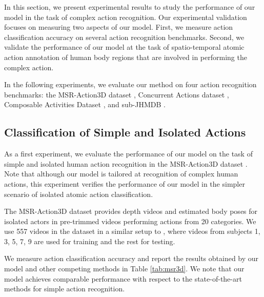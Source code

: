 In this section, we present experimental results to study the performance
of our model in the task of complex action recognition. Our experimental
validation focuses on measuring two aspects of our model.
First, we measure action classification accuracy on
several action recognition benchmarks.
Second, we validate the performance of our model at the
task of spatio-temporal atomic action
annotation of human body regions that are involved in performing the complex
action.


In the following experiments, we evaluate our method on four action recognition
benchmarks:
the MSR-Action3D dataset \cite{WanLi2010},
Concurrent Actions dataset \cite{Wei2013},
Composable Activities Dataset \cite{Lillo2014}, and sub-JHMDB
\cite{Jhuang2013}.


\subsection{Classification of Simple and Isolated Actions}

As a first experiment,
we evaluate the performance of our model on the task of simple and
isolated human action recognition in the  MSR-Action3D dataset
\cite{WanLi2010}.
Note that although our model is tailored at recognition of complex human
actions, this experiment verifies the performance of our model in the
simpler scenario of isolated atomic action classification.

The MSR-Action3D dataset provides depth videos and estimated body poses
for isolated actors in pre-trimmed videos performing actions from 20
categories. We use 557 videos in the dataset in a similar setup to
\cite{Wang2012}, where videos from subjects 1, 3, 5, 7, 9 are used for
training and the rest for testing.

We measure action classification accuracy and report the results obtained
by our model and other competing methods in Table \ref{tab:msr3d}.
We note that our model achieves comparable performance with respect
to the state-of-the-art methods for simple action recognition.

